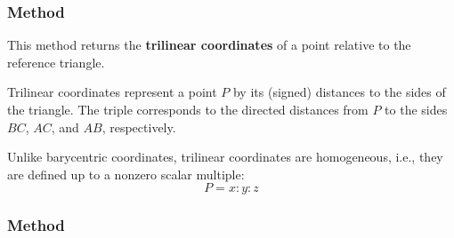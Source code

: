 \vspace{1em}
\begin{minipage}{.45\textwidth}
  \let\tul\tkzUseLua
\end{minipage}
\begin{minipage}{.55\textwidth}
\begin{tkzexample}
\end{tkzexample}
\end{minipage}

\subsubsection{Method }
\label{ssub:triangle_trilinear_coordinates_pt}

This method returns the \textbf{trilinear coordinates} of a point relative to the reference triangle.

\medskip

Trilinear coordinates represent a point $P$ by its (signed) distances to the sides of the triangle. The triple  corresponds to the directed distances from $P$ to the sides $BC$, $AC$, and $AB$, respectively.

\begin{mybox}
\end{mybox}

\medskip

Unlike barycentric coordinates, trilinear coordinates are homogeneous, i.e., they are defined up to a nonzero scalar multiple:
\[
P = x : y : z
\]


\subsubsection{Method }
\label{ssub:method_triangle_get_angle}

